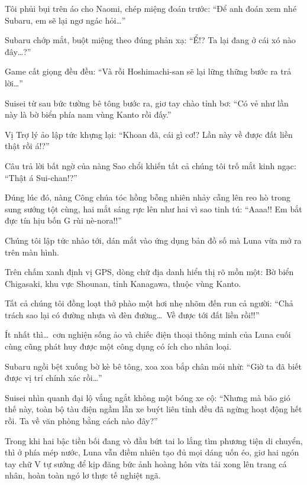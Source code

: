 \documentclass[../main.tex]{subfiles}
\begin{document}
Tôi phủi bụi trên áo cho Naomi, chép miệng đoán trước: ``Để anh đoán xem nhé Subaru, em sẽ lại ngơ ngác hỏi\dots''

Subaru chớp mắt, buột miệng theo đúng phản xạ: ``Ể!? Ta lại đang ở cái xó nào đây\dots?''

Game cất giọng đều đều: ``Và rồi Hoshimachi-san sẽ lại lững thững bước ra trả lời\dots''

Suisei từ sau bức tường bê tông bước ra, giơ tay chào tỉnh bơ: ``Có vẻ như lần này là bờ biển phía nam vùng Kanto rồi đấy.''

Vị Trợ lý ảo lập tức khựng lại: ``Khoan đã, cái gì cơ!? Lần này về được đất liền thật rồi á!?''

Câu trả lời bất ngờ của nàng Sao chổi khiến tất cả chúng tôi trố mắt kinh ngạc: ``Thật á Sui-chan!?''

Đúng lúc đó, nàng Công chúa tóc hồng bỗng nhiên nhảy cẫng lên reo hò trong sung sướng tột cùng, hai mắt sáng rực lên như hai vì sao tinh tú: ``Aaaa!! Em bắt đực tín hịu bốn G rùi nè-nora!!''


Chúng tôi lập tức nhào tới, dán mắt vào ứng dụng bản đồ số mà Luna vừa mở ra trên màn hình.

Trên chấm xanh định vị GPS, dòng chữ địa danh hiển thị rõ mồn một: Bờ biển Chigasaki, khu vực Shounan, tỉnh Kanagawa, thuộc vùng Kanto.

Tất cả chúng tôi đồng loạt thở phào một hơi nhẹ nhõm đến run cả người: ``Chả trách sao lại có đường nhựa và đèn đường\dots\ Về được tới đất liền rồi!!''

Ít nhất thì\dots\ cơn nghiện sống ảo và chiếc điện thoại thông minh của Luna cuối cùng cũng phát huy được một công dụng có ích cho nhân loại.

\omk

Subaru ngồi bệt xuống bờ kè bê tông, xoa xoa bắp chân mỏi nhừ: ``Giờ ta đã biết được vị trí chính xác rồi\dots''

Suisei nhìn quanh đại lộ vắng ngắt không một bóng xe cộ: ``Nhưng mà bão gió thế này, toàn bộ tàu điện ngầm lẫn xe buýt liên tỉnh đều đã ngừng hoạt động hết rồi. Ta về văn phòng bằng cách nào đây?''

Trong khi hai bậc tiền bối đang vò đầu bứt tai lo lắng tìm phương tiện di chuyển, thì ở phía mép nước, Luna vẫn điềm nhiên tạo đủ mọi dáng uốn éo, giơ hai ngón tay chữ V tự sướng để kịp đăng bức ảnh hoàng hôn vừa tải xong lên trang cá nhân, hoàn toàn ngó lơ thực tế nghiệt ngã.
\end{document}
